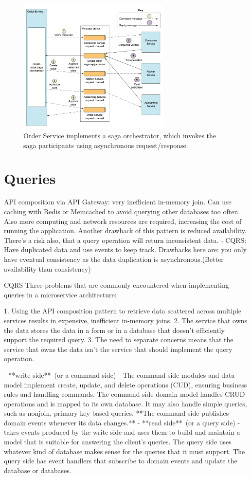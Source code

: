 \documentclass[conference]{IEEEtran}
\begin{document}
\begin{figure}[!htbp]
\centering
\includegraphics[width=3in]{jpeg/orchestrator-saga}
\caption{Order Service implements a saga orchestrator, which invokes the saga participants using asynchronous request/response.}
\label{orchestrator_saga}
\end{figure}

\section{Queries}

API composition via API Gateway: very inefficient in-memory join. Can use caching with Redis or Memcached to avoid querying other databases too often. Also more computing and network resources are required, increasing the cost of running the application. Another drawback of this pattern is reduced availability. There’s a risk also, that a query operation will return inconsistent data.
    - CQRS: Have duplicated data and use events to keep track. Drawbacks here are: you only have eventual consistency as the data duplication is asynchronous.(Better availability than consistency)

CQRS
Three problems that are commonly encountered when implementing queries in a microservice architecture:

1. Using the API composition pattern to retrieve data scattered across multiple services results in expensive, inefficient in-memory joins.
2. The service that owns the data stores the data in a form or in a database that doesn’t efficiently support the required query.
3. The need to separate concerns means that the service that owns the data isn’t the service that should implement the query operation.

- **write side** (or a command side) - The command side modules and data model implement create, update, and delete operations (CUD), ensuring business rules and handling commands. The command-side domain model handles CRUD operations and is mapped to its own database. It may also handle simple queries, such as nonjoin, primary key-based queries. **The command side publishes domain events whenever its data changes.**
- **read side** (or a query side) - takes events produced by the write side and uses them to build and maintain a model that is suitable for answering the client’s queries. The query side uses whatever kind of database makes sense for the queries that it must support. The query side has event handlers that subscribe to domain events and update the database or databases.
\end{document}
